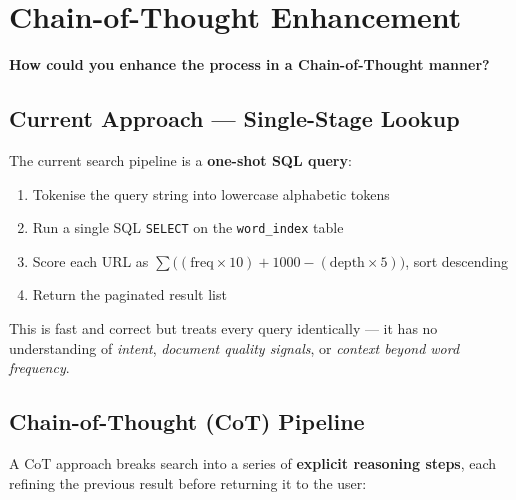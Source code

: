 \documentclass[12pt,a4paper]{article}
\begin{document}
\newpage
\section{Chain-of-Thought Enhancement}

\textbf{How could you enhance the process in a Chain-of-Thought manner?}

\subsection*{Current Approach — Single-Stage Lookup}

The current search pipeline is a \textbf{one-shot SQL query}:

\begin{enumerate}[noitemsep]
  \item Tokenise the query string into lowercase alphabetic tokens
  \item Run a single SQL \texttt{SELECT} on the \texttt{word\_index} table
  \item Score each URL as $\sum\!\bigl((\text{freq}\times10)+1000-(\text{depth}\times5)\bigr)$, sort descending
  \item Return the paginated result list
\end{enumerate}

\noindent
This is fast and correct but treats every query identically — it has no
understanding of \emph{intent}, \emph{document quality signals}, or
\emph{context beyond word frequency}.

\subsection*{Chain-of-Thought (CoT) Pipeline}

A CoT approach breaks search into a series of \textbf{explicit reasoning steps},
each refining the previous result before returning it to the user:
\end{document}
